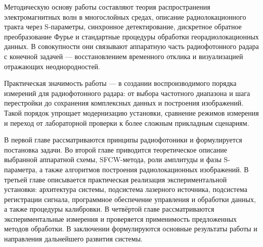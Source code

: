 Методическую основу работы составляют теория распространения электромагнитных
волн в многослойных средах, описание радиолокационного тракта через S-параметры,
синхронное детектирование, дискретное обратное преобразование Фурье и стандартные
процедуры обработки георадиолокационных данных. В совокупности они связывают
аппаратную часть радиофотонного радара с конечной задачей --- восстановлением
временного отклика и визуализацией отражающих неоднородностей.

Практическая значимость работы --- в создании воспроизводимого порядка измерений
для радиофотонного радара: от выбора частотного диапазона и шага перестройки до
сохранения комплексных данных и построения изображений. Такой порядок упрощает
модернизацию установки, сравнение режимов измерения и переход от лабораторной
проверки к более сложным прикладным сценариям.

В первой главе рассматриваются принципы радиофотоники и формулируется постановка
задачи. Во второй главе приводится теоретическое описание выбранной аппаратной
схемы, SFCW-метода, роли амплитуды и фазы S-параметра, а также алгоритмов
построения радиолокационных изображений. В третьей главе описывается практическая
реализация экспериментальной установки: архитектура системы, подсистема
лазерного источника, подсистема регистрации сигнала, программное обеспечение
управления и обработки данных, а также процедуры калибровки. В четвёртой главе
рассматриваются экспериментальные измерения и проверяется применимость
предложенных методов обработки. В заключении формулируются основные результаты
работы и направления дальнейшего развития системы.
